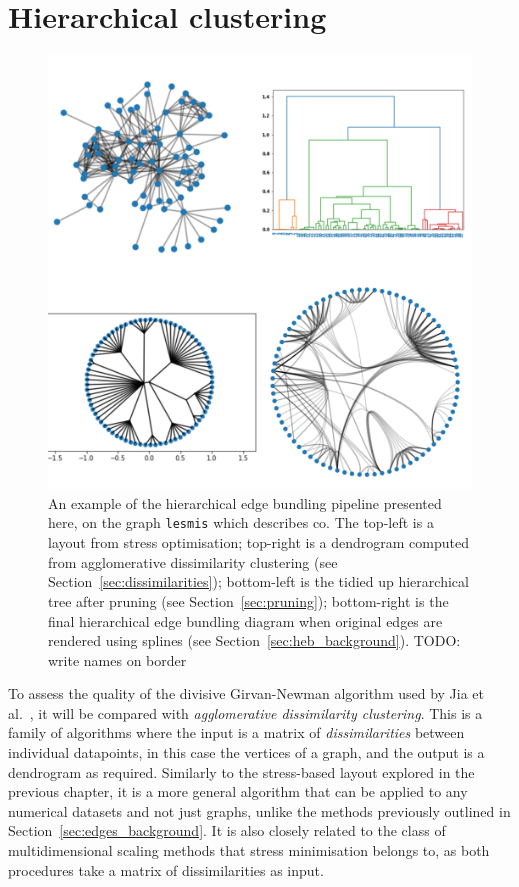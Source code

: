\section{Hierarchical clustering}
\begin{figure}
    \centering
    \includegraphics[width=\linewidth]{power/lesmis.pdf}
    \caption[A hierarchical edge bundling pipeline]{An example of the hierarchical edge bundling pipeline presented here, on the graph \texttt{lesmis} which describes co. The top-left is a layout from stress optimisation; top-right is a dendrogram computed from agglomerative dissimilarity clustering (see Section~\ref{sec:dissimilarities}); bottom-left is the tidied up hierarchical tree after pruning (see Section~\ref{sec:pruning}); bottom-right is the final hierarchical edge bundling diagram when original edges are rendered using splines (see Section~\ref{sec:heb_background}).
    TODO: write names on border}
    \label{fig:lesmis}
\end{figure}
To assess the quality of the divisive Girvan-Newman algorithm used by Jia et al.\ \cite{Jia2011}, it will be compared with \emph{agglomerative dissimilarity clustering}.
This is a family of algorithms where the input is a matrix of \emph{dissimilarities} between individual datapoints, in this case the vertices of a graph, and the output is a dendrogram as required. Similarly to the stress-based layout explored in the previous chapter, it is a more general algorithm that can be applied to any numerical datasets and not just graphs, unlike the methods previously outlined in Section~\ref{sec:edges_background}. It is also closely related to the class of multidimensional scaling methods that stress minimisation belongs to, as both procedures take a matrix of dissimilarities as input.

